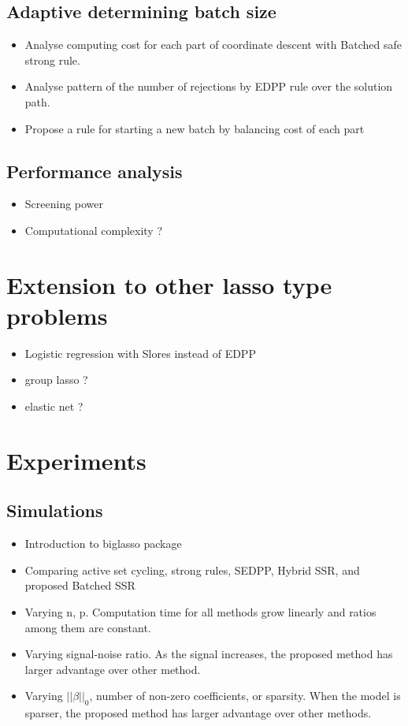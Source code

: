 \documentclass{article}
\begin{document}
\subsection{Adaptive determining batch size}
\label{sec:batch-size}
\begin{itemize}
    \item Analyse computing cost for each part of coordinate descent with Batched safe strong rule.
    \item Analyse pattern of the number of rejections by EDPP rule over the solution path.
    \item Propose a rule for starting a new batch by balancing cost of each part
\end{itemize}

\subsection{Performance analysis}
\begin{itemize}
    \item Screening power
    \item Computational complexity ?
\end{itemize}

\section{Extension to other lasso type problems}
\label{sec:4}

\begin{itemize}
    \item Logistic regression with Slores instead of EDPP
    \item group lasso ?
    \item elastic net ?
\end{itemize}

\section{Experiments}
\label{sec:5}

\subsection{Simulations}
\label{sec:sim}
\begin{itemize}
    \item Introduction to biglasso package
\end{itemize}
\begin{itemize}
    \item Comparing active set cycling, strong rules, SEDPP, Hybrid SSR, and proposed Batched SSR
    \item Varying n, p. Computation time for all methods grow linearly and ratios among them are constant.
    \item Varying signal-noise ratio. As the signal increases, the proposed method has larger advantage over other method.
    \item Varying $||\beta||_0$, number of non-zero coefficients, or sparsity. When the model is sparser, the proposed method has larger advantage over other methods.
\end{itemize}
\end{document}
